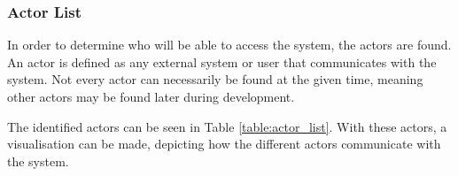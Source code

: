 
\subsubsection{Actor List}
In order to determine who will be able to access the system, the actors are
found. An actor is defined as any external system or user that communicates
with the system. Not every actor can necessarily be found at the given time,
meaning other actors may be found later during development.

The identified actors can be seen in Table \ref{table:actor_list}. With these
actors, a visualisation can be made, depicting how the different actors
communicate with the system.

